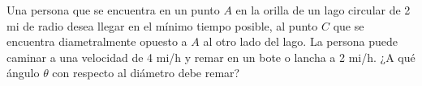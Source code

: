 \item Una persona que se encuentra en un punto $A$ en la orilla de un lago circular de 2 mi de radio desea llegar en el mínimo tiempo posible, al punto $C$ que se encuentra diametralmente opuesto a $A$ al otro lado del lago. La persona puede caminar a una velocidad de 4 mi/h y remar en un bote o lancha a 2 mi/h. ¿A qué ángulo $\theta$ con respecto al diámetro debe remar?
\begin{center}
\end{center}
